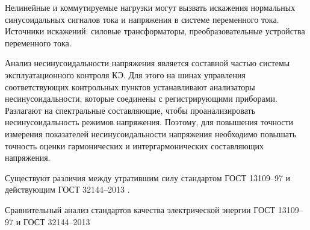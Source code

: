


Нелинейные и коммутируемые нагрузки могут вызвать искажения нормальных синусоидальных сигналов тока и напряжения в системе переменного тока. Источники искажений: силовые трансформаторы, преобразовательные устройства переменного тока.

Анализ несинусоидальности напряжения является составной частью системы эксплуатационного контроля КЭ. Для этого на шинах управления соответствующих контрольных пунктов устанавливают анализаторы несинусоидальности, которые соединены с регистрирующими приборами. Разлагают на спектральные составляющие, чтобы проанализировать несинусоидальность режимов напряжения. Поэтому, для повышения точности измерения показателей несинусоидальности напряжения необходимо повышать точность оценки гармонических и интергармонических составляющих напряжения. 

Существуют различия между утратившим силу стандартом ГОСТ 13109--97 \cite{ГОСТ13109-97} и действующим ГОСТ 32144--2013 \cite{ГОСТ32144-2013}.

Сравнительный анализ стандартов качества электрической энергии ГОСТ 13109--97 и ГОСТ 32144--2013 \cite[с.~155]{Киселёв}

